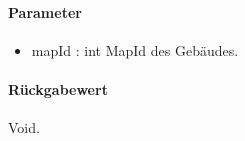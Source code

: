 \paragraph*{Parameter}
\begin{itemize}
    \item mapId : int MapId des Gebäudes.
\end{itemize}
\paragraph*{Rückgabewert}
Void.
